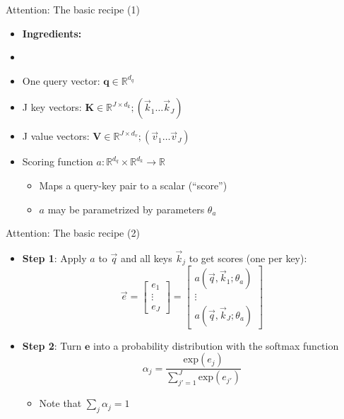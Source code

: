 \documentclass[11pt,compress,t,notes=noshow, xcolor=table]{beamer}
\begin{document}

\begin{vbframe}{Attention: The basic recipe (1)}

\vfill

\begin{itemize}
	\item \textbf{Ingredients:}
	\item[]
	\item One query vector: $\mathbf{q} \in \mathbb{R}^{d_q}$
	\item J key vectors: $\mathbf{K} \in \mathbb{R}^{J \times d_k}; (\vec k_1 \ldots \vec k_J)$
	\item J value vectors: $\mathbf{V} \in \mathbb{R}^{J \times d_v}; (\vec v_1 \ldots \vec v_J)$
	\item Scoring function $a : \mathbb{R}^{d_q} \times \mathbb{R}^{d_k} \rightarrow \mathbb{R}$
		\begin{itemize}
			\item Maps a query-key pair to a scalar (``score'')
			\item $a$ may be parametrized by parameters $\theta_a$
		\end{itemize}
\end{itemize}

\vfill

\end{vbframe}


\begin{vbframe}{Attention: The basic recipe (2)}

\vfill

\begin{itemize}
	\item \textbf{Step 1}: Apply $a$ to $\vec q$ and all keys $\vec k_j$ to get scores (one per key): 
	$$\vec e = \begin{bmatrix} e_1 \\ \vdots \\ e_J \end{bmatrix} =  \begin{bmatrix} a(\vec q, \vec k_1; \theta_a) \\ \vdots \\ a(\vec q, \vec k_J; \theta_a) \end{bmatrix}$$
	\item \textbf{Step 2}: Turn $\mathbf{e}$ into a probability distribution with the softmax function
	$$\alpha_j = \frac{\mathrm{exp}(e_j)}{\sum_{j'=1}^J \mathrm{exp}(e_{j'})}$$
		\begin{itemize}
			\item Note that $\sum_j \alpha_j = 1$
		\end{itemize}
\end{itemize}

\vfill

\end{vbframe}
\end{document}
